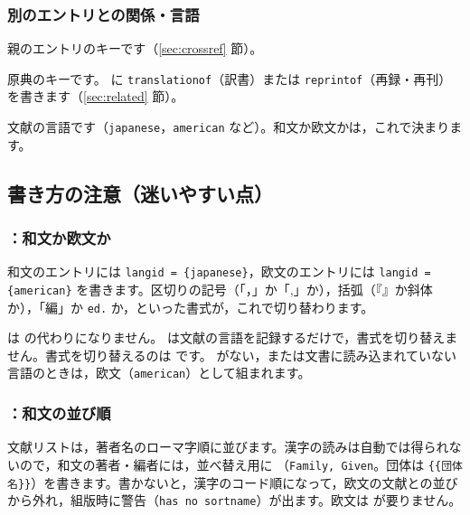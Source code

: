 \subsubsection{別のエントリとの関係・言語}
\begin{fieldlist}

親のエントリのキーです（\ref{sec:crossref} 節）。


原典のキーです。 に \texttt{translationof}（訳書）または \texttt{reprintof}（再録・再刊）を書きます（\ref{sec:related} 節）。


文献の言語です（\texttt{japanese}，\texttt{american} など）。和文か欧文かは，これで決まります。
\end{fieldlist}

\subsection{書き方の注意（迷いやすい点）}\label{sec:cautions}
\subsubsection{：和文か欧文か}
和文のエントリには \texttt{langid = \{japanese\}}，欧文のエントリには \texttt{langid = \{american\}} を書きます。区切りの記号（「，」か「,」か），括弧（『』か斜体か），「編」か \texttt{ed.} か，といった書式が，これで切り替わります。

\begin{caution}
 は  の代わりになりません。 は文献の言語を記録するだけで，書式を切り替えません。書式を切り替えるのは  です。 がない，または文書に読み込まれていない言語のときは，欧文（\texttt{american}）として組まれます。
\end{caution}

\subsubsection{：和文の並び順}
文献リストは，著者名のローマ字順に並びます。漢字の読みは自動では得られないので，和文の著者・編者には，並べ替え用に （\texttt{Family, Given}。団体は \texttt{\{\{団体名\}\}}）を書きます。書かないと，漢字のコード順になって，欧文の文献との並びから外れ，組版時に警告（\texttt{has no sortname}）が出ます。欧文は  が要りません。


